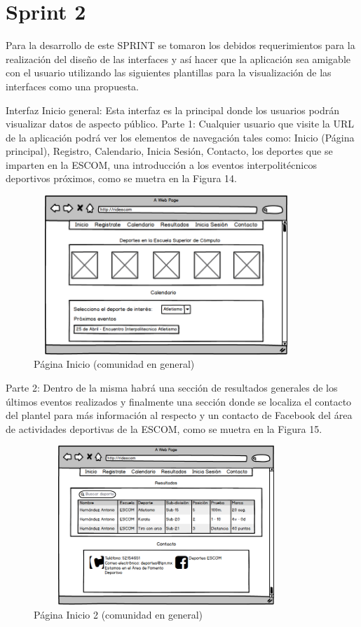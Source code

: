 	
	\section{Sprint 2}
	\noindent Para la desarrollo de este SPRINT se tomaron los debidos requerimientos para la realización del diseño de las interfaces y así hacer que la aplicación sea amigable con el usuario utilizando las siguientes plantillas para la visualización de las interfaces como una propuesta.
	
	\noindent Interfaz Inicio general: Esta interfaz es la principal donde los usuarios podrán visualizar datos de aspecto público. \newline
	Parte 1:
	Cualquier usuario que visite la URL de la aplicación podrá ver los elementos de navegación tales como: Inicio (Página principal), Registro, Calendario, Inicia Sesión, Contacto, los deportes que se imparten en la ESCOM, una introducción a los eventos interpolitécnicos deportivos próximos, como se muetra en la Figura 14. 
	\begin{figure}[hbt!]
		\centering
		\includegraphics[width=10cm, height=6cm]{Imagenes/Disenos/p19Iniciogeneral.png}
		\caption{Página Inicio (comunidad en general)}
	\end{figure}
	\pagebreak
	Parte 2:
	Dentro de la misma habrá una sección de resultados generales de los últimos eventos realizados y finalmente una  sección donde se localiza el contacto del plantel para más información al respecto y un contacto de Facebook del área de actividades deportivas de la ESCOM, como se muetra en la Figura 15.
	\begin{figure}[hbt!]
		\centering
		\includegraphics[width=10cm, height=6cm]{Imagenes/Disenos/p20Iniciogeneral1.png}
		\caption{Página Inicio 2 (comunidad en general)}
	\end{figure}
	
